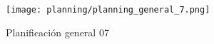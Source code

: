\FloatBarrier
\begin{center}
\begin{figure}[h]
\centering
\texttt{[image: planning/planning\_general\_7.png]} \\
\caption{Planificación general 07 }
\end{figure}
\end{center}
\FloatBarrier


